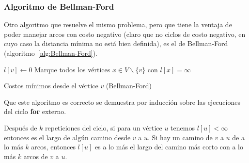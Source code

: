 \subsubsection{Algoritmo de Bellman-Ford}
\label{sec:Bellman-Ford}

  Otro algoritmo que resuelve el mismo problema,
  pero que tiene la ventaja
  de poder manejar arcos con costo negativo
  (claro que no ciclos de costo negativo,
   en cuyo caso la distancia mínima no está bien definida),
  es el de Bellman-Ford~%
    \cite{bellman58:_routin_probl}
  (algoritmo~\ref{alg:Bellman-Ford}).
  \begin{algorithm}[htbp]
    \DontPrintSemicolon

    \KwProcedure {} \;
    \BlankLine
    \(l[v] \leftarrow 0\) \;
    Marque todos los vértices \(x \in V \smallsetminus \{v\}\)
      con \(l[x] = \infty\) \;
    \BlankLine
    \caption{Costos mínimos desde el vértice $v$ (Bellman-Ford)}
    \label{alg:Bellman-Ford}
  \end{algorithm}
  Que este algoritmo es correcto
  se demuestra por inducción%
  sobre las ejecuciones del ciclo \textbf{for} externo.
  \begin{theorem}
    Después de \(k\) repeticiones del ciclo,
    si para un vértice \(u\) tenemos \(l[u] < \infty\)
    entonces es el largo de algún camino desde \(v\) a \(u\).
    Si hay un camino de \(v\) a \(u\) de a lo más \(k\) arcos,
    entonces \(l[u]\) es a lo más el largo del camino más corto
    con a lo más \(k\) arcos de \(v\) a \(u\).
  \end{theorem}
